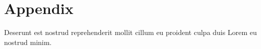\section{Appendix} \label{appC}
Deserunt est nostrud reprehenderit mollit cillum eu proident culpa duis Lorem eu nostrud minim.
